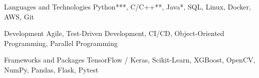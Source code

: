 \vspace{-0.1cm}

\begin{cvskills}

  \cvskill
    {Languages and Technologies}
    {Python***, C/C++**, Java*, SQL, Linux, Docker, AWS, Git}
    
  \cvskill
    {Development}
    {Agile, Test-Driven Development, CI/CD, Object-Oriented Programming, Parallel Programming}
    
    
  \cvskill
    {Frameworks and Packages}
    {TensorFlow / Keras, Scikit-Learn, XGBoost, OpenCV, NumPy, Pandas, Flask, Pytest}

\end{cvskills}
